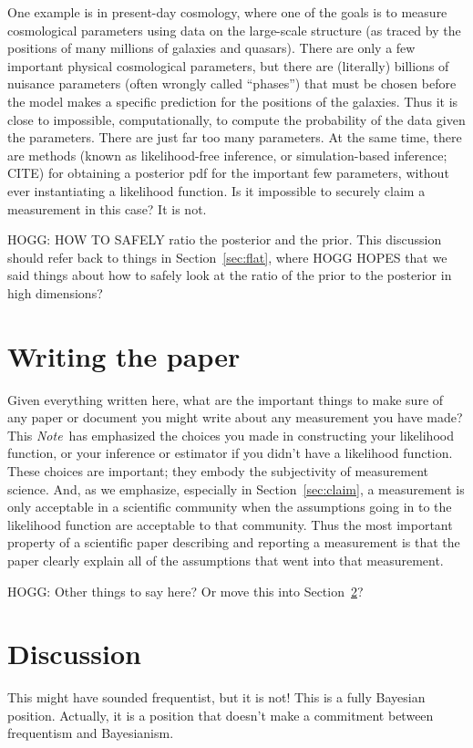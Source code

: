 \documentclass{article}
\newcommand{\documentname}{\textsl{Note}}
\newcommand{\sectionname}{Section}
\newcommand{\secref}[1]{\sectionname~\ref{#1}}
\begin{document}
One example is in present-day cosmology, where one of the goals is to measure cosmological parameters using data on the large-scale structure (as traced by the positions of many millions of galaxies and quasars).
There are only a few important physical cosmological parameters, but there are (literally) billions of nuisance parameters (often wrongly called ``phases'') that must be chosen before the model makes a specific prediction for the positions of the galaxies.
Thus it is close to impossible, computationally, to compute the probability of the data given the parameters.
There are just far too many parameters.
At the same time, there are methods (known as likelihood-free inference, or simulation-based inference; CITE) for obtaining a posterior pdf for the important few parameters, without ever instantiating a likelihood function.
Is it impossible to securely claim a measurement in this case?
It is not.

HOGG: HOW TO SAFELY ratio the posterior and the prior.
This discussion should refer back to things in \secref{sec:flat}, where HOGG HOPES that we said things about how to safely look at the ratio of the prior to the posterior in high dimensions?

\section{Writing the paper}\label{sec:writing}
Given everything written here, what are the important things to make sure of any paper or document you might write about any measurement you have made?
This \documentname\ has emphasized the choices you made in constructing your likelihood function, or your inference or estimator if you didn't have a likelihood function.
These choices are important; they embody the subjectivity of measurement science.
And, as we emphasize, especially in \secref{sec:claim}, a measurement is only acceptable in a scientific community when the assumptions going in to the likelihood function are acceptable to that community.
Thus the most important property of a scientific paper describing and reporting a measurement is that the paper clearly explain all of the assumptions that went into that measurement.

HOGG: Other things to say here? Or move this into \secref{sec:discussion}?

\section{Discussion}\label{sec:discussion}
This might have sounded frequentist, but it is not!
This is a fully Bayesian position.
Actually, it is a position that doesn't make a commitment between frequentism and Bayesianism.
\end{document}
